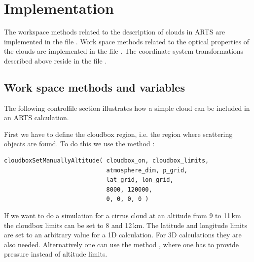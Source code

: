\section{Implementation}

The workspace methods related to the description of clouds in ARTS are
implemented in the file .
Work space methods related to the optical properties of the clouds are
implemented in the file . The coordinate system
transformations described above reside in the file
.

\subsection{Work space methods and variables}

The following controlfile section illustrates how a simple cloud can
be included in an ARTS calculation. 

First we have to define the cloudbox region, i.e. the region where
scattering objects are found. To do this we use the method
:
\begin{verbatim}
cloudboxSetManuallyAltitude( cloudbox_on, cloudbox_limits,
                             atmosphere_dim, p_grid,
                             lat_grid, lon_grid,
                             8000, 120000,
                             0, 0, 0, 0 )
\end{verbatim}
If we want to do a simulation for a
cirrus cloud at an altitude from 9 to 11\,km the cloudbox limits can
be set to 8 and 12\,km. The latitude and longitude limits are set to
an arbitrary value for a 1D calculation. For 3D calculations they are
also needed. Alternatively one can use the method
, where one has to provide pressure
instead of altitude limits. 
 

